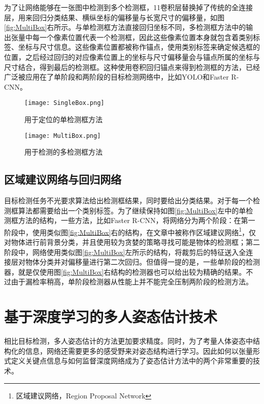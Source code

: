 为了让网络能够在一张图中检测到多个检测框，1\times1卷积层替换掉了传统的全连接层，用来回归分类结果、横纵坐标的偏移量与长宽尺寸的偏移量，如图\ref{fig:MultiBox}右所示。与单检测框方法直接回归坐标不同，多检测框方法中的输出张量中每一个像素位置代表一个检测框，因此这些像素位置本身就包含着类别标签、坐标与尺寸信息。这些像素位置都被称作锚点，使用类别标签来确定候选框的位置，之后经过回归的对应像素位置上的坐标与尺寸偏移量会与锚点所属的坐标与尺寸结合，得到最后的检测框。这种使用卷积回归锚点来得到检测框的方法，已经广泛被应用在了单阶段和两阶段的目标检测网络中，比如YOLO\cite{redmon2016you}和Faster R-CNN\cite{Ren2015Faster}。

\begin{figure*}[htbp]	
	\centering
	\begin{subfigure}[b]{0.4\textwidth}
		\texttt{[image: SingleBox.png]}
		\caption{用于定位的单检测框方法}
	\end{subfigure}
	\hskip1.5cm
	\begin{subfigure}[b]{0.4\textwidth}
		\texttt{[image: MultiBox.png]}
		\caption{用于检测的多检测框方法}
	\end{subfigure}
	\caption{基于卷积神经网络的定位与检测方法}
	\label{fig:MultiBox}
\end{figure*}

\subsection{区域建议网络与回归网络}
\label{subsec:factsRPNregression}
目标检测任务不光要求算法给出检测框结果，同时要给出分类结果。对于每一个检测框算法都需要给出一个类别标签。为了继续保持如图\ref{fig:MultiBox}左中的单检测框方法的结构，一些方法，比如Faster R-CNN\cite{Ren2015Faster}，将网络分为两个阶段：在第一阶段中，使用类似图\ref{fig:MultiBox}右的结构，在文章中被称作区域建议网络\footnote{区域建议网络，Region Proposal Network}，仅对物体进行前背景分类，并且使用较为贪婪的策略寻找可能是物体的检测框；第二阶段中，网络使用类似图\ref{fig:MultiBox}左所示的结构，将裁剪后的特征送入全连接层对物体分类并对偏移量进行第二次回归。但值得一提的是，一些单阶段的检测器，就是仅使用图\ref{fig:MultiBox}右结构的检测器也可以给出较为精确的结果。不过由于漏检率稍高，单阶段检测器从性能上并不能完全压制两阶段的检测方法。

\section{基于深度学习的多人姿态估计技术}
\label{sec:factspose}
相比目标检测，多人姿态估计的方法更加要求精度。同时，为了考量人体姿态中结构化的信息，网络还需要更多的感受野来对姿态结构进行学习。因此如何以张量形式定义关键点信息与如何监督深度网络成为了姿态估计方法中的两个非常重要的技术。

